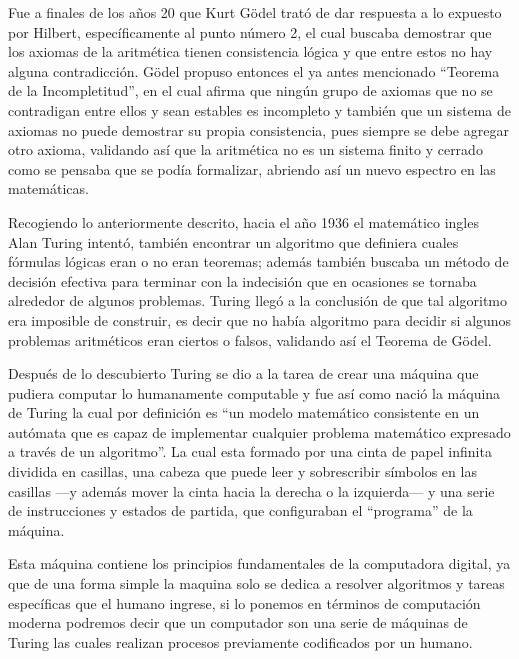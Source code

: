 \documentclass[12pt]{article}
\begin{document}
\vspace{10PT}
Fue a finales de los años 20 que Kurt Gödel trató de dar respuesta a lo expuesto por Hilbert, específicamente al punto número 2, el cual buscaba demostrar que los axiomas de la aritmética tienen consistencia lógica y que entre estos no hay alguna contradicción. Gödel propuso entonces el ya antes mencionado “Teorema de la Incompletitud”, en el cual afirma que ningún grupo de axiomas que no se contradigan entre ellos y sean estables es incompleto y también que un sistema de axiomas no puede demostrar su propia consistencia, pues siempre se debe agregar otro axioma, validando así que la aritmética no es un sistema finito y cerrado como se pensaba que se podía formalizar, abriendo así un nuevo espectro en las matemáticas.

\vspace{10PT}
Recogiendo lo anteriormente descrito, hacia el año 1936 el matemático ingles Alan Turing intentó, también encontrar un algoritmo que definiera cuales fórmulas lógicas eran o no eran teoremas; además también buscaba un método de decisión efectiva para terminar con la indecisión que en ocasiones se tornaba alrededor de algunos problemas. Turing llegó a la conclusión de que tal algoritmo era imposible de construir, es decir que no había algoritmo para decidir si algunos problemas aritméticos eran ciertos o falsos, validando así el Teorema de Gödel.

\vspace{10PT}
Después de lo descubierto Turing se dio a la tarea de crear una máquina que pudiera computar lo humanamente computable y fue así como nació la máquina de Turing la cual por definición es “un modelo matemático consistente en un autómata que es capaz de implementar cualquier problema matemático expresado a través de un algoritmo”\cite{thoth38_2016}. La cual esta formado por una cinta de papel infinita dividida en casillas, una cabeza que puede leer y sobrescribir símbolos en las casillas —y además mover la cinta hacia la derecha o la izquierda— y una serie de instrucciones y estados de partida, que configuraban el “programa” de la máquina.

\vspace{10PT}
Esta máquina contiene los principios fundamentales de la computadora digital, ya que de una forma simple la maquina solo se dedica a resolver algoritmos y tareas específicas que el humano ingrese, si lo ponemos en términos de computación moderna podremos decir que un computador son una serie de máquinas de Turing las cuales realizan procesos previamente codificados por un humano. 
\end{document}
